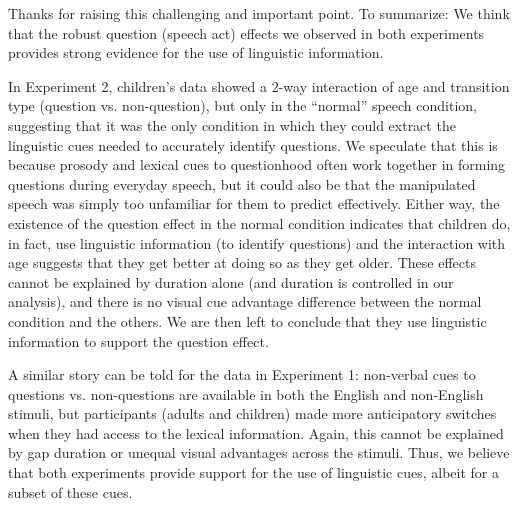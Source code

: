 \documentclass[11pt,a4paper]{letter} %
\begin{document}
\begin{letter}{}
\noindent Thanks for raising this challenging and important point. To summarize: We think that the robust question (speech act) effects we observed in both experiments provides strong evidence for the use of linguistic information.

In Experiment 2, children's data showed a 2-way interaction of age and transition type (question vs. non-question), but only in the ``normal'' speech condition, suggesting that it was the only condition in which they could extract the linguistic cues needed to accurately identify questions. We speculate that this is because prosody and lexical cues to questionhood often work together in forming questions during everyday speech, but it could also be that the manipulated speech was simply too unfamiliar for them to predict effectively. Either way, the existence of the question effect in the normal condition indicates that children do, in fact, use linguistic information (to identify questions) and the interaction with age suggests that they get better at doing so as they get older. These effects cannot be explained by duration alone (and duration is controlled in our analysis), and there is no visual cue advantage difference between the normal condition and the others. We are then left to conclude that they use linguistic information to support the question effect. 

A similar story can be told for the data in Experiment 1: non-verbal cues to questions vs. non-questions are available in both the English and non-English stimuli, but participants (adults and children) made more anticipatory switches when they had access to the lexical information. Again, this cannot be explained by gap duration or unequal visual advantages across the stimuli. Thus, we believe that both experiments provide support for the use of linguistic cues, albeit for a subset of these cues. 



\end{letter}
\end{document}
